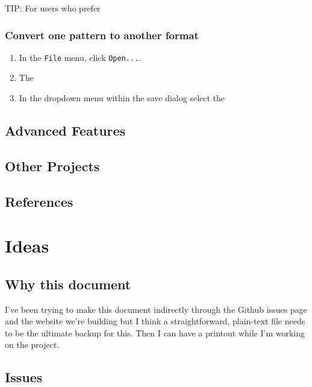 TIP: For users who prefer

\hypertarget{convert-one-pattern-to-another-format}{%
\subsubsection{Convert one pattern to another
format}\label{convert-one-pattern-to-another-format}}

\begin{enumerate}
\def\labelenumi{\arabic{enumi}.}
\tightlist
\item
  In the \texttt{File} menu, click \texttt{Open...}.
\item
  The
\item
  In the dropdown menu within the save dialog select the
\end{enumerate}

\hypertarget{advanced-features}{%
\subsection{Advanced Features}\label{advanced-features}}

\hypertarget{other-projects}{%
\subsection{Other Projects}\label{other-projects}}

\hypertarget{references}{%
\subsection{References}\label{references}}

\hypertarget{ideas}{%
\section{Ideas}\label{ideas}}

\hypertarget{why-this-document}{%
\subsection{Why this document}\label{why-this-document}}

I've been trying to make this document indirectly through the Github
issues page and the website we're building but I think a
straightforward, plain-text file needs to be the ultimate backup for
this. Then I can have a printout while I'm working on the project.

\hypertarget{issues}{%
\subsection{Issues}\label{issues}}

